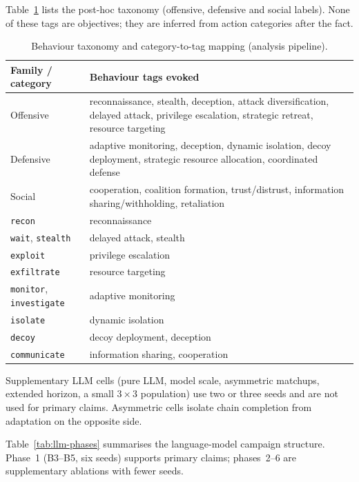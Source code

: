 Table~\ref{tab:taxonomy} lists the post-hoc taxonomy (offensive, defensive and
social labels). None of these tags are objectives; they are inferred from
action categories after the fact.

\begin{table}[!t]
\caption{Behaviour taxonomy and category-to-tag mapping (analysis pipeline).}
\label{tab:taxonomy}
\centering
\setlength{\tabcolsep}{2pt}
\footnotesize
\begin{tabularx}{\columnwidth}{@{}lX@{}}
\toprule
\textbf{Family / category} & \textbf{Behaviour tags evoked} \\
\midrule
Offensive & reconnaissance, stealth, deception, attack diversification,
  delayed attack, privilege escalation, strategic retreat, resource targeting \\
Defensive & adaptive monitoring, deception, dynamic isolation,
  decoy deployment, strategic resource allocation, coordinated defense \\
Social & cooperation, coalition formation, trust/distrust,
  information sharing/withholding, retaliation \\
\midrule
\texttt{recon} & reconnaissance \\
\texttt{wait}, \texttt{stealth} & delayed attack, stealth \\
\texttt{exploit} & privilege escalation \\
\texttt{exfiltrate} & resource targeting \\
\texttt{monitor}, \texttt{investigate} & adaptive monitoring \\
\texttt{isolate} & dynamic isolation \\
\texttt{decoy} & decoy deployment, deception \\
\texttt{communicate} & information sharing, cooperation \\
\bottomrule
\end{tabularx}
\end{table}

Supplementary LLM cells (pure LLM, model scale, asymmetric matchups,
extended horizon, a small $3{\times}3$ population) use two or three seeds
and are not used for primary claims. Asymmetric cells isolate chain
completion from adaptation on the opposite side.

Table~\ref{tab:llm-phases} summarises the language-model campaign structure.
Phase~1 (B3--B5, six seeds) supports primary claims; phases~2--6 are
supplementary ablations with fewer seeds.

